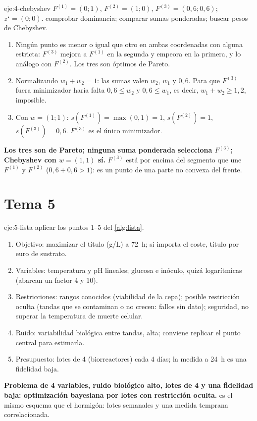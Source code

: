 \begin{solucion}{eje:4-chebyshev}
\datos $F^{(1)}=(0;1)$, $F^{(2)}=(1;0)$, $F^{(3)}=(0{,}6;0{,}6)$; $z^\star=(0;0)$.
\planteamiento comprobar dominancia; comparar sumas ponderadas; buscar pesos de Chebyshev.
\pasos
\begin{enumerate}[label=(\alph*)]
  \item Ningún punto es menor o igual que otro en ambas coordenadas con alguna estricta: $F^{(3)}$ mejora a $F^{(1)}$ en la segunda y empeora en la primera, y lo análogo con $F^{(2)}$. Los tres son óptimos de Pareto.
  \item Normalizando $w_1+w_2=1$: las sumas valen $w_2$, $w_1$ y $0{,}6$. Para que $F^{(3)}$ fuera minimizador haría falta $0{,}6\le w_2$ y $0{,}6\le w_1$, es decir, $w_1+w_2\ge1{,}2$, imposible.
  \item Con $w=(1;1)$: $s(F^{(1)})=\max(0,1)=1$, $s(F^{(2)})=1$, $s(F^{(3)})=0{,}6$. $F^{(3)}$ es el único minimizador.
\end{enumerate}
\resultado \textbf{Los tres son de Pareto; ninguna suma ponderada selecciona $F^{(3)}$; Chebyshev con $w=(1,1)$ sí.}
\comprobacion $F^{(3)}$ está por encima del segmento que une $F^{(1)}$ y $F^{(2)}$ ($0{,}6+0{,}6>1$): es un punto de una parte no convexa del frente.
\end{solucion}

\section{Tema 5}

\begin{solucion}{eje:5-lista}
\planteamiento aplicar los puntos 1–5 del \cref{alg:lista}.
\pasos
\begin{enumerate}[label=\arabic*.]
  \item Objetivo: maximizar el título (g/L) a 72~h; si importa el coste, título por euro de sustrato.
  \item Variables: temperatura y pH lineales; glucosa e inóculo, quizá logarítmicas (abarcan un factor 4 y 10).
  \item Restricciones: rangos conocidos (viabilidad de la cepa); posible restricción oculta (tandas que se contaminan o no crecen: fallos sin dato); seguridad, no superar la temperatura de muerte celular.
  \item Ruido: variabilidad biológica entre tandas, alta; conviene replicar el punto central para estimarla.
  \item Presupuesto: lotes de 4 (biorreactores) cada 4 días; la medida a 24~h es una fidelidad baja.
\end{enumerate}
\resultado \textbf{Problema de 4 variables, ruido biológico alto, lotes de 4 y una fidelidad baja: optimización bayesiana por lotes con restricción oculta.}
\comprobacion es el mismo esquema que el hormigón: lotes semanales y una medida temprana correlacionada.
\end{solucion}

